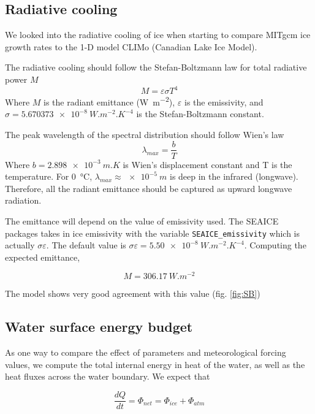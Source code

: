 \documentclass[11pt]{article}
\begin{document}
\subsection{Radiative cooling}
We looked into the radiative cooling of ice when starting to compare MITgcm ice growth rates to the 1-D model CLIMo (Canadian Lake Ice Model).

The radiative cooling should follow the Stefan-Boltzmann law for total radiative power $M$
\begin{equation}
M = \varepsilon \sigma T^4
\end{equation}
Where $M$ is the radiant emittance (\si{W.m^{-2}}), $\varepsilon$ is the emissivity, and $\sigma = \SI{5.670373e-8}{W.m^{-2}.K^{-4}}$ is the Stefan-Boltzmann constant.

The peak wavelength of the spectral distribution should follow Wien's law
\begin{equation}
\lambda_{max} = \frac{b}{T}
\end{equation}
Where $b = \SI{2.898e-3}{m.K}$ is Wien's displacement constant and T is the temperature. For \SI{0}{\celsius}, $\lambda_{max} \approx \SI{e-5}{m}$ is deep in the infrared (longwave). Therefore, all the radiant emittance should be captured as upward longwave radiation.

The emittance will depend on the value of emissivity used. The SEAICE packages takes in ice emissivity with the variable \verb|SEAICE_emissivity| which is actually $\sigma \varepsilon$. The default value is $\sigma \varepsilon = \SI{5.50e-8}{ W.m^{-2}.K^{-4}}$.  Computing the expected emittance, 

\begin{equation*}
M = \SI{306.17}{W.m^{-2}}
\end{equation*}

The model shows very good agreement with this value (fig. \ref{fig:SB})

\subsection{Water surface energy budget}
As one way to compare the effect of parameters and meteorological forcing values, we compute the total internal energy in heat of the water, as well as the heat fluxes across the water boundary. We expect that

\begin{equation}
\frac{d Q}{d t} = \Phi_{net} = \Phi_{ice} + \Phi_{atm}
\end{equation}
\end{document}
